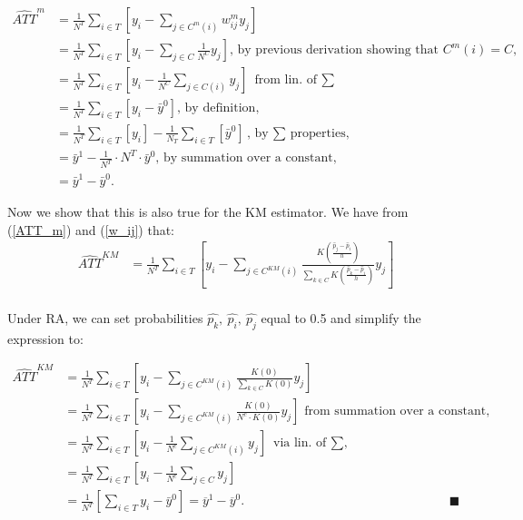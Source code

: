 \documentclass[
]{article}
\begin{document}
\begin{align*}
    \widehat{ATT}^{m} &= \frac{1}{N^T}\sum_{i\in T} \left[y_i - \sum_{j \in C^{m}(i)} w_{ij}^m y_j\right]\\ 
                      &= \frac{1}{N^T}\sum_{i \in T} \left[  y_i - \sum_{j \in C} \frac{1}{N^C} y_j\right] \text{, by previous derivation showing that $C^{m}(i) = C$, }\\
                      &= \frac{1}{N^T}\sum_{i \in T}  \left[ y_i - \frac{1}{N^C} \sum_{j \in C\left( i\right)} y_j \right] \text{ from lin. of $\sum$}\\
                      &= \frac{1}{N^T}\sum_{i \in T}  \left[ y_i - \bar{y}^0 \right] \text{, by definition, }\\
                      &= \frac{1}{N^T}\sum_{i \in T} [y_i] - \frac{1}{N_T} \sum_{i\in T} [\bar{y}^0]\text{, by $\sum$ properties, }\\
                      &= \bar{y}^1 - \frac{1}{N^T} \cdot N^T \cdot \bar{y}^0 \text{, by summation over a constant, } \\
                      &= \bar{y}^1 - \bar{y}^0. 
\end{align*}

Now we show that this is also true for the KM estimator. We have from
(\ref{ATT_m}) and (\ref{w_ij}) that: \begin{align*}
    \widehat{ATT}^{KM} &= \frac{1}{N^T} \sum_{i \in T} \left[  y_i - \sum_{j \in C^{KM}\left( i\right)}\frac{K\left( \frac{\hat{p}_{j} - \hat{p}_{i}}{h}\right)}{\sum_{k \in C}K \left( \frac{\hat{p}_{k}-\hat{p}_{i}}{h}\right)} y_j \right ] \\
  \end{align*}

Under RA, we can set probabilities
\(\hat{p_k}, \ \hat{p_i}, \ \hat{p_j}\) equal to 0.5 and simplify the
expression to:

\begin{align*}
    \widehat{ATT}^{KM} &= \frac{1}{N^T} \sum_{i \in T} \left[  y_i - \sum_{j \in C^{KM}\left( i\right)}\frac{K\left(0\right)}{\sum_{k \in C} K \left(0\right)} y_j \right] \\
                       &= \frac{1}{N^T} \sum_{i \in T} \left[  y_i - \sum_{j \in C^{KM}\left( i\right)}\frac{K\left(0\right)}{N^c \cdot K \left(0\right)} y_j \right] \text{ from summation over a constant,} \\
                       &= \frac{1}{N^T} \sum_{i \in T} \left[  y_i - \frac{1}{N^c} \sum_{j \in C^{KM}\left( i\right)} y_j \right] \text{ via lin. of $\sum$,} \\
                       &= \frac{1}{N^T} \sum_{i \in T} \left[  y_i - \frac{1}{N^c} \sum_{j \in C} y_j \right] \\
                       &= \frac{1}{N^T} \left[ \sum_{i \in T} y_i - \bar{y}^0 \right] = \overline{y}^{1} - \overline{y}^{0}. & \blacksquare
  \end{align*}
\end{document}
